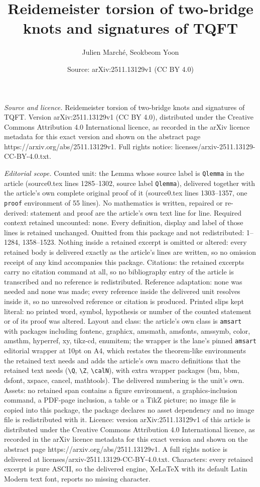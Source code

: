 \documentclass[10pt,a4paper]{amsart}
\title[Reidemeister torsion of two-bridge knots and signatures of T]{Reidemeister torsion of two-bridge knots and signatures of TQFT}
\author{Julien March\'e, Seokbeom Yoon}
\date{Source: arXiv:2511.13129v1 (CC BY 4.0)}
\begin{document}
\maketitle

\noindent\emph{Source and licence.} Reidemeister torsion of two-bridge knots and signatures of TQFT. Version arXiv:2511.13129v1 (CC BY 4.0), distributed under the Creative Commons Attribution 4.0 International licence, as recorded in the arXiv licence metadata for this exact version and shown on the abstract page https://arxiv.org/abs/2511.13129v1. Full rights notice: licenses/arxiv-2511.13129-CC-BY-4.0.txt.\par\smallskip

\noindent\textit{Editorial scope.} Counted unit: the Lemma whose source label is \texttt{Qlemma} in the article (source0.tex lines 1285--1302, source label \texttt{Qlemma}), delivered together with the article's own complete original proof of it (source0.tex lines 1303--1357, one \texttt{proof} environment of 55 lines). No mathematics is written, repaired or re-derived: statement and proof are the article's own text line for line. Required context retained uncounted: none. Every definition, display and label of those lines is retained unchanged. Omitted from this package and not redistributed: 1--1284, 1358--1523. Nothing inside a retained excerpt is omitted or altered: every retained body is delivered exactly as the article's lines are written, so no omission receipt of any kind accompanies this package. Citations: the retained excerpts carry no citation command at all, so no bibliography entry of the article is transcribed and no reference is redistributed. Reference adaptation: none was needed and none was made; every reference inside the delivered unit resolves inside it, so no unresolved reference or citation is produced. Printed slips kept literal: no printed word, symbol, hypothesis or number of the counted statement or of its proof was altered. Layout and class: the article's own class is \texttt{amsart} with packages including fontenc, graphicx, amsmath, amsfonts, amssymb, color, amsthm, hyperref, xy, tikz-cd, enumitem; the wrapper is the lane's pinned \texttt{amsart} editorial wrapper at 10pt on A4, which restates the theorem-like environments the retained text needs and adds the article's own macro definitions that the retained text needs (\texttt{\textbackslash Q}, \texttt{\textbackslash Z}, \texttt{\textbackslash calN}), with extra wrapper packages (bm, bbm, dsfont, xspace, cancel, mathtools). The delivered numbering is the unit's own. Assets: no retained span contains a figure environment, a graphics-inclusion command, a PDF-page inclusion, a table or a TikZ picture; no image file is copied into this package, the package declares no asset dependency and no image file is redistributed with it. Licence: version arXiv:2511.13129v1 of this article is distributed under the Creative Commons Attribution 4.0 International licence, as recorded in the arXiv licence metadata for this exact version and shown on the abstract page https://arxiv.org/abs/2511.13129v1. A full rights notice is delivered at licenses/arxiv-2511.13129-CC-BY-4.0.txt. Characters: every retained excerpt is pure ASCII, so the delivered engine, XeLaTeX with its default Latin Modern text font, reports no missing character.
\end{document}
